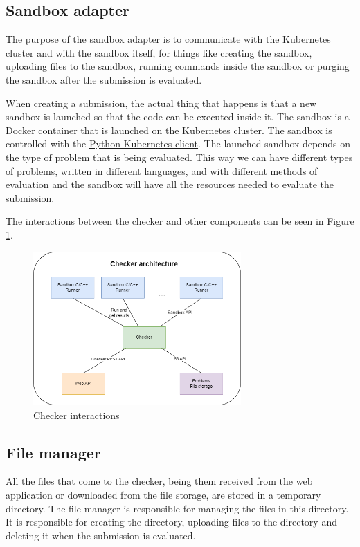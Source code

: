 \documentclass[12pt,a4paper]{report}
\begin{document}
\subsection{Sandbox adapter}
The purpose of the sandbox adapter is to communicate with the Kubernetes cluster and with the sandbox itself, for things like creating the sandbox, uploading files to the sandbox, running commands inside the sandbox or purging the sandbox after the submission is evaluated.

When creating a submission, the actual thing that happens is that a new sandbox is launched so that the code can be executed inside it. The sandbox is a Docker container that is launched on the Kubernetes cluster. The sandbox is controlled with the \href{https://github.com/kubernetes-client/python}{Python Kubernetes client}. The launched sandbox depends on the type of problem that is being evaluated. This way we can have different types of problems, written in different languages, and with different methods of evaluation and the sandbox will have all the resources needed to evaluate the submission.

The interactions between the checker and other components can be seen in Figure \ref{fig:checker-interactions}.
\begin{figure}[h]
	\centering
	\includegraphics[width=300px]{../photos/checker-architecture.png}
	\caption{Checker interactions}
	\label{fig:checker-interactions}
\end{figure} 


\subsection{File manager}
All the files that come to the checker, being them received from the web application or downloaded from the file storage, are stored in a temporary directory. The file manager is responsible for managing the files in this directory. It is responsible for creating the directory, uploading files to the directory and deleting it when the submission is evaluated.
\end{document}
